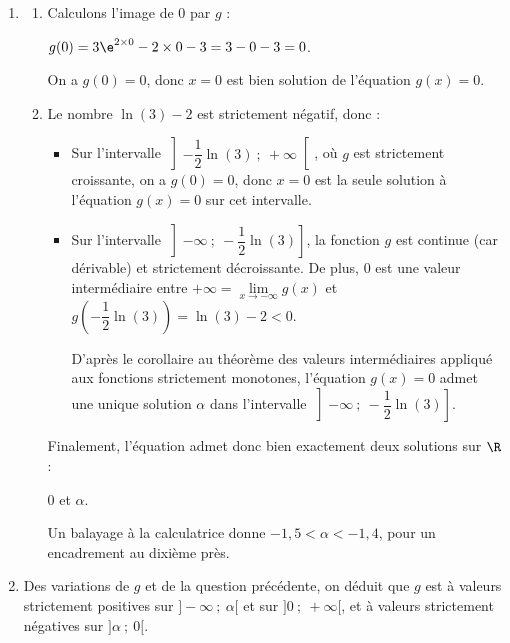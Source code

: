 \begin{enumerate}
\begin{enumerate}
\begin{center}
		 \end{center}
		 

		 
		 
		 
		 
		 
		 
		 

La fonction $g$ admet bien un minimum égal à $\ln (3)-2$, atteint pour $x = -\dfrac{1}{2}\ln(3)$.
	\end{enumerate}
\item 
	\begin{enumerate}
		\item Calculons l'image de 0 par $g$ :

$g(0) = 3\e^{2\times 0} - 2\times 0 - 3 = 3 - 0 - 3 = 0$.

On a $g(0) = 0$, donc $x = 0$ est bien solution de l'équation $g(x)=0$.
		\item Le nombre $\ln (3)-2$ est strictement négatif, donc :

\begin{itemize}
\item Sur l'intervalle $\left]-\dfrac{1}{2}\ln(3)~;~+\infty\right[$, où $g$ est strictement croissante, on a $g(0) = 0$, donc $x=0$ est la seule solution à l'équation $g(x) = 0$ sur cet intervalle.
\item Sur l'intervalle $\left]-\infty~;~ -\dfrac{1}{2}\ln(3) \right]$, la fonction $g$ est continue (car dérivable) et strictement décroissante. De plus, 0 est une valeur intermédiaire entre $+\infty = \lim\limits_{x \to -\infty} g(x)$ et $g\left(-\dfrac{1}{2}\ln(3)\right) = \ln(3) - 2 < 0$.

D'après le corollaire au théorème des valeurs intermédiaires appliqué aux fonctions strictement monotones, l'équation $g(x) = 0$ admet une unique solution $\alpha$ dans l'intervalle $\left]-\infty~;~ -\dfrac{1}{2}\ln(3) \right]$.
\end{itemize}

Finalement, l'équation admet donc bien exactement deux solutions sur $\R$ : 

0 et $\alpha$.

Un balayage à la calculatrice donne $-1,5 <\alpha < -1,4$, pour un encadrement au dixième près.
	\end{enumerate}
\item Des variations de $g$ et de la question précédente, on déduit que $g$ est à valeurs strictement positives sur $]-\infty~;~\alpha[$ et sur $]0~;~+\infty[$, et à valeurs strictement négatives sur $]\alpha~;~0[$.
	\end{enumerate}


